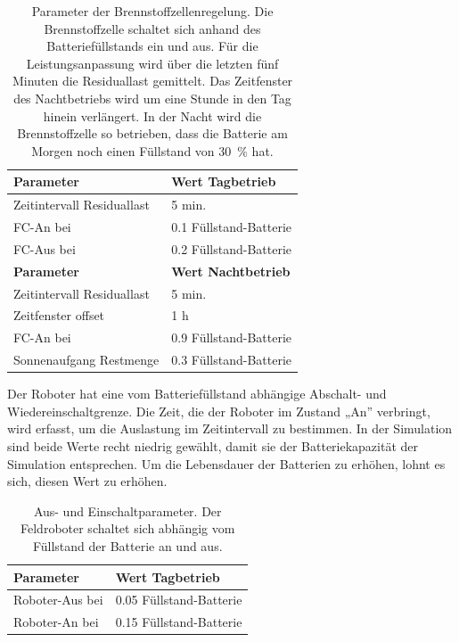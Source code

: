 \begin{table}
\centering
\begin{tabular}{|l|l|}
\hline
\textbf{Parameter} & \textbf{Wert Tagbetrieb} \\ \hline
Zeitintervall Residuallast & 5 min. \\ \hline
FC-An bei & 0.1 Füllstand-Batterie \\ \hline
FC-Aus bei & 0.2 Füllstand-Batterie \\ \hline
\textbf{Parameter} & \textbf{Wert Nachtbetrieb} \\ \hline
Zeitintervall Residuallast & 5 min. \\ \hline
Zeitfenster offset & 1 h \\ \hline
FC-An bei & 0.9 Füllstand-Batterie \\ \hline
Sonnenaufgang Restmenge & 0.3 Füllstand-Batterie \\ \hline
\end{tabular}
\caption{Parameter der Brennstoffzellenregelung. Die Brennstoffzelle schaltet sich anhand des Batteriefüllstands ein und aus. Für die Leistungsanpassung wird über die letzten fünf Minuten die Residuallast gemittelt. Das Zeitfenster des Nachtbetriebs wird um eine Stunde in den Tag hinein verlängert. In der Nacht wird die Brennstoffzelle so betrieben, dass die Batterie am Morgen noch einen Füllstand von 30~\% hat.}
\label{tab:paramregelung}
\end{table}

Der Roboter hat eine vom Batteriefüllstand abhängige Abschalt- und Wiedereinschaltgrenze. Die Zeit, die der Roboter im Zustand „An” verbringt, wird erfasst, um die Auslastung im Zeitintervall zu bestimmen. In der Simulation sind beide Werte recht niedrig gewählt, damit sie der Batteriekapazität der Simulation entsprechen. Um die Lebensdauer der Batterien zu erhöhen, lohnt es sich, diesen Wert zu erhöhen. \\



\begin{table}
\centering
\begin{tabular}{|l|l|}
\hline
\textbf{Parameter} & \textbf{Wert Tagbetrieb} \\ \hline
Roboter-Aus bei & 0.05 Füllstand-Batterie \\ \hline
Roboter-An bei & 0.15 Füllstand-Batterie \\ \hline
\end{tabular}
\caption{Aus- und Einschaltparameter. Der Feldroboter schaltet sich abhängig vom Füllstand der Batterie an und aus.}
\end{table}

